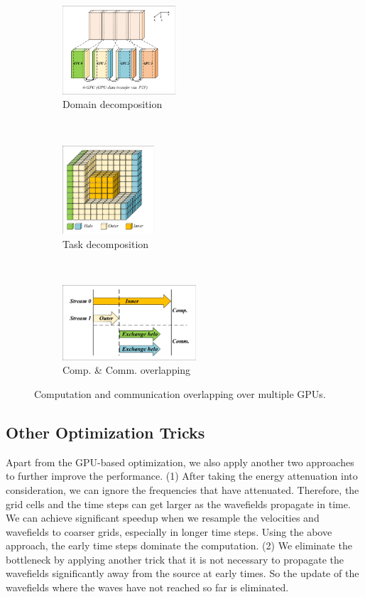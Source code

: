 \documentclass{paris17}
\begin{document}
\begin{figure}[h]
    \centering
    \begin{subfigure}[b]{0.3\textwidth}
        \centering
        \includegraphics[height=1.3in]{./fig/domain-decompose.pdf}
        \caption{Domain decomposition}
        \label{fig:domain-decomposition}
    \end{subfigure}%
    ~
    \begin{subfigure}[b]{0.3\textwidth}
        \centering
        \includegraphics[height=1.3in]{./fig/inner-outer.pdf}
        \caption{Task decomposition}
        \label{fig:task-decomposition}
    \end{subfigure}
    ~
    \begin{subfigure}[b]{0.3\textwidth}
        \centering
        \includegraphics[height=1.1in]{./fig/overlap.pdf}
        \caption{Comp. \& Comm. overlapping}
        \label{fig:overlap}
    \end{subfigure}
    \caption{Computation and communication overlapping over multiple GPUs.}
\end{figure}

\subsection{Other Optimization Tricks}

Apart from the GPU-based optimization, we also apply another two approaches to further improve the performance.  (1) After taking the energy attenuation into consideration, we can ignore the frequencies that have attenuated. Therefore, the grid cells and the time steps can get larger as the wavefields propagate in time. We can achieve significant speedup when we resample the velocities and wavefields to coarser grids, especially in longer time steps. Using the above approach, the early time steps dominate the computation. (2) We eliminate the bottleneck by applying another trick that it is not necessary to propagate the wavefields significantly away from the source at early times. So the update of the wavefields where the waves have not reached so far is eliminated.
\end{document}
